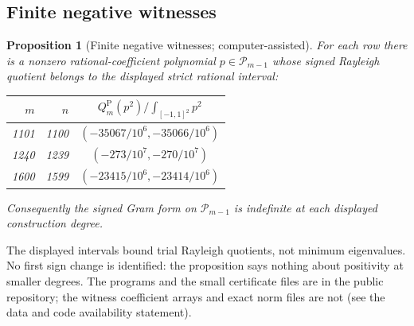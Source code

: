\documentclass[preprint,12pt,a4paper]{elsarticle}
\newtheorem{proposition}[theorem]{Proposition}
\theoremstyle{remark}
\newcommand{\Pa}{\mathrm P}
\begin{document}
\subsection{Finite negative witnesses}

\begin{proposition}[Finite negative witnesses; computer-assisted]\label{prop:padua-finite-negative}
For each row there is a nonzero rational-coefficient polynomial
$p\in\mathcal P_{m-1}$ whose signed Rayleigh quotient belongs to the
displayed strict rational interval:
\begin{center}
\begin{tabular}{rrc}\toprule
$m$ & $n$ & $Q_m^\Pa(p^2)/\int_{[-1,1]^2}p^2$\\\midrule
1101 & 1100 & $(-35067/10^6,-35066/10^6)$\\
1240 & 1239 & $(-273/10^7,-270/10^7)$\\
1600 & 1599 & $(-23415/10^6,-23414/10^6)$\\\bottomrule
\end{tabular}
\end{center}
Consequently the signed Gram form on $\mathcal P_{m-1}$ is indefinite
at each displayed construction degree.
\end{proposition}
The displayed intervals bound trial Rayleigh quotients, not minimum
eigenvalues. No first sign change is identified: the proposition says nothing
about positivity at smaller degrees. The programs and the small certificate files
are in the public repository; the witness coefficient arrays and exact norm files
are not (see the data and code availability statement).
\end{document}
